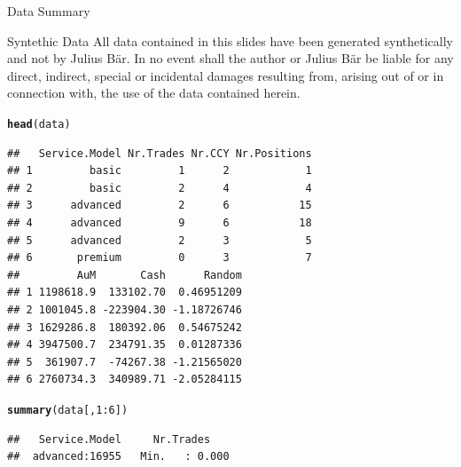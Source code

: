 \documentclass{beamer}\usepackage[]{graphicx}\usepackage[]{color}
\makeatletter
\newcommand{\hlnum}[1]{\textcolor[rgb]{0.686,0.059,0.569}{#1}}%
\newcommand{\hlopt}[1]{\textcolor[rgb]{0,0,0}{#1}}%
\newcommand{\hlstd}[1]{\textcolor[rgb]{0.345,0.345,0.345}{#1}}%
\newcommand{\hlkwd}[1]{\textcolor[rgb]{0.737,0.353,0.396}{\textbf{#1}}}%
\newenvironment{kframe}{%
 \def\at@end@of@kframe{}%
 \ifinner\ifhmode%
  \def\at@end@of@kframe{\end{minipage}}%
  \begin{minipage}{\columnwidth}%
 \fi\fi%
 \def\FrameCommand##1{\hskip\@totalleftmargin \hskip-\fboxsep
 \colorbox{shadecolor}{##1}\hskip-\fboxsep
     \hskip-\linewidth \hskip-\@totalleftmargin \hskip\columnwidth}%
 \MakeFramed {\advance\hsize-\width
   \@totalleftmargin\z@ \linewidth\hsize
   \@setminipage}}%
 {\par\unskip\endMakeFramed%
 \at@end@of@kframe}
\newenvironment{knitrout}{}{} %
\makeatother
\begin{document}
\begin{frame}[fragile]{Data Summary}

\tiny
{
\begin{block}{\tiny Syntethic Data}
All data contained in this slides have been generated synthetically and not by Julius B\"{a}r. In no event shall the author or Julius B\"{a}r be liable for any direct, indirect, special or incidental damages resulting from, arising out of or in connection with, the use of the data contained herein.
\end{block}
}
\begin{minipage}[t]{0.45\textwidth}
  \vspace{0pt}

  
\begin{knitrout}
\color{fgcolor}\begin{kframe}
\begin{alltt}
\hlkwd{head}\hlstd{(data)}
\end{alltt}
\begin{verbatim}
##   Service.Model Nr.Trades Nr.CCY Nr.Positions
## 1         basic         1      2            1
## 2         basic         2      4            4
## 3      advanced         2      6           15
## 4      advanced         9      6           18
## 5      advanced         2      3            5
## 6       premium         0      3            7
##         AuM       Cash      Random
## 1 1198618.9  133102.70  0.46951209
## 2 1001045.8 -223904.30 -1.18726746
## 3 1629286.8  180392.06  0.54675242
## 4 3947500.7  234791.35  0.01287336
## 5  361907.7  -74267.38 -1.21565020
## 6 2760734.3  340989.71 -2.05284115
\end{verbatim}
\end{kframe}
\end{knitrout}
\end{minipage}
\hfill
\begin{minipage}[t]{0.45\textwidth}
  \vspace{0pt}
\begin{knitrout}
\color{fgcolor}\begin{kframe}
\begin{alltt}
\hlkwd{summary}\hlstd{(data[,}\hlnum{1}\hlopt{:}\hlnum{6}\hlstd{])}
\end{alltt}
\begin{verbatim}
##   Service.Model     Nr.Trades     
##  advanced:16955   Min.   : 0.000  

\end{verbatim}
\end{kframe}
\end{knitrout}
\end{minipage}
\end{frame}
\end{document}
